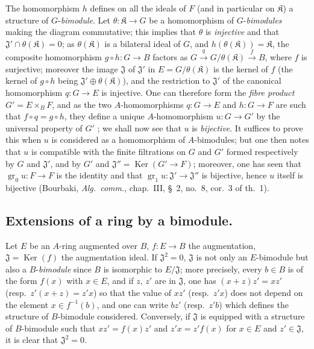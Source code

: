 \begin{env}[18.1.7]
The homomorphism $h$ defines on all the ideals of $F$ (and in particular on $\mathfrak{K}$) a structure of $G$-\emph{bimodule}.
Let $\theta:\mathfrak{K}\to G$ be a homomorphism of $G$-\emph{bimodules} making the diagram  commutative; this implies that $\theta$ is \emph{injective} and that $\mathfrak{J}'\cap\theta(\mathfrak{K})=0$; as $\theta(\mathfrak{K})$ is a bilateral ideal of $G$, and $h(\theta(\mathfrak{K}))=\mathfrak{K}$, the composite homomorphism $g\circ h:G\to B$ factors as $G\xrightarrow{q}G/\theta(\mathfrak{K})\xrightarrow{f}B$, where $f$ is surjective; moreover the image $\mathfrak{J}$ of $\mathfrak{J}'$ in $E=G/\theta(\mathfrak{K})$ is the kernel of $f$ (the kernel of $g\circ h$ being $\mathfrak{J}'\oplus\theta(\mathfrak{K})$), and the restriction to $\mathfrak{J}'$ of the canonical homomorphism $q:G\to E$ is injective.
One can therefore form the \emph{fibre product} $G'=E\times_B F$, and as the two $A$-homomorphisms $q:G\to E$ and $h:G\to F$ are such that $f\circ q=g\circ h$, they define a unique $A$-homomorphism $u:G\to G'$ by the universal property of $G'$ ; we shall now see that $u$ is \emph{bijective}.
It suffices to prove this when $u$ is considered as a homomorphism of $A$-bimodules; but one then notes that $u$ is compatible with the finite filtrations on $G$ and $G'$ formed respectively by $G$ and $\mathfrak{J}'$, and by $G'$ and $\mathfrak{J}''=\operatorname{Ker}(G'\to F)$; moreover, one has seen  that $\operatorname{gr}_0 u:F\to F$ is the identity and that $\operatorname{gr}_1 u:\mathfrak{J}'\to\mathfrak{J}''$ is bijective, hence $u$ itself is bijective (Bourbaki, \emph{Alg.\ comm.}, chap.~III, \S~2, no.~8, cor.~3 of th.~1).
\end{env}

\subsection{Extensions of a ring by a bimodule.}
\label{subsection:0.18.2}

\begin{env}[18.2.1]
\label{0.18.2.1}
Let $E$ be an $A$-ring augmented over $B$, $f:E\to B$ the augmentation, $\mathfrak{J}=\operatorname{Ker}(f)$ the augmentation ideal.
If $\mathfrak{J}^2=0$, $\mathfrak{J}$ is not only an $E$-bimodule but also a $B$-\emph{bimodule} since $B$ is isomorphic to $E/\mathfrak{J}$; more precisely, every $b\in B$ is of the form $f(x)$ with $x\in E$, and if $z$, $z'$ are in $\mathfrak{J}$, one has $(x+z)z'=xz'$ (resp.\ $z'(x+z)=z'x$) so that the value of $xz'$ (resp.\ $z'x$) does not depend on the element $x\in f^{-1}(b)$, and one can write $bz'$ (resp.\ $z'b$) which defines the structure of $B$-bimodule considered.
Conversely, if $\mathfrak{J}$ is equipped with a structure of $B$-bimodule such that $xz'=f(x)z'$ and $z'x=z'f(x)$ for $x\in E$ and $z'\in\mathfrak{J}$, it is clear that $\mathfrak{J}^2=0$.
\end{env}

